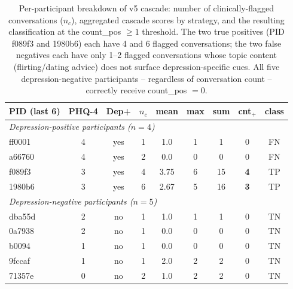 \documentclass[letterpaper]{article}
\begin{document}
\begin{table}[t]
\scriptsize
\centering
\setlength{\tabcolsep}{3pt}
\begin{tabular}{lcccccccc}
\toprule
PID (last 6) & PHQ-4 & Dep+ & $n_c$ & mean & max & sum & cnt$_{+}$ & class \\
\midrule
\multicolumn{9}{l}{\textit{Depression-positive participants ($n=4$)}} \\
ff0001 & 4 & yes & 1 & 1.0 & 1 & 1 & 0 & FN \\
a66760 & 4 & yes & 2 & 0.0 & 0 & 0 & 0 & FN \\
f089f3 & 3 & yes & 4 & 3.75 & 6 & 15 & \textbf{4} & TP \\
1980b6 & 3 & yes & 6 & 2.67 & 5 & 16 & \textbf{3} & TP \\
\midrule
\multicolumn{9}{l}{\textit{Depression-negative participants ($n=5$)}} \\
dba55d & 2 & no & 1 & 1.0 & 1 & 1 & 0 & TN \\
0a7938 & 2 & no & 1 & 0.0 & 0 & 0 & 0 & TN \\
b0094  & 1 & no & 1 & 0.0 & 0 & 0 & 0 & TN \\
9fccaf & 1 & no & 1 & 2.0 & 2 & 2 & 0 & TN \\
71357e & 0 & no & 2 & 1.0 & 2 & 2 & 0 & TN \\
\bottomrule
\end{tabular}
\caption{Per-participant breakdown of v5 cascade: number of clinically-flagged conversations ($n_c$), aggregated cascade scores by strategy, and the resulting classification at the count\_pos $\geq 1$ threshold. The two true positives (PID f089f3 and 1980b6) each have 4 and 6 flagged conversations; the two false negatives each have only 1--2 flagged conversations whose topic content (flirting/dating advice) does not surface depression-specific cues. All five depression-negative participants -- regardless of conversation count -- correctly receive count\_pos $=0$.}
\label{tab:rq3_v5_perpart}
\end{table}
\end{document}

